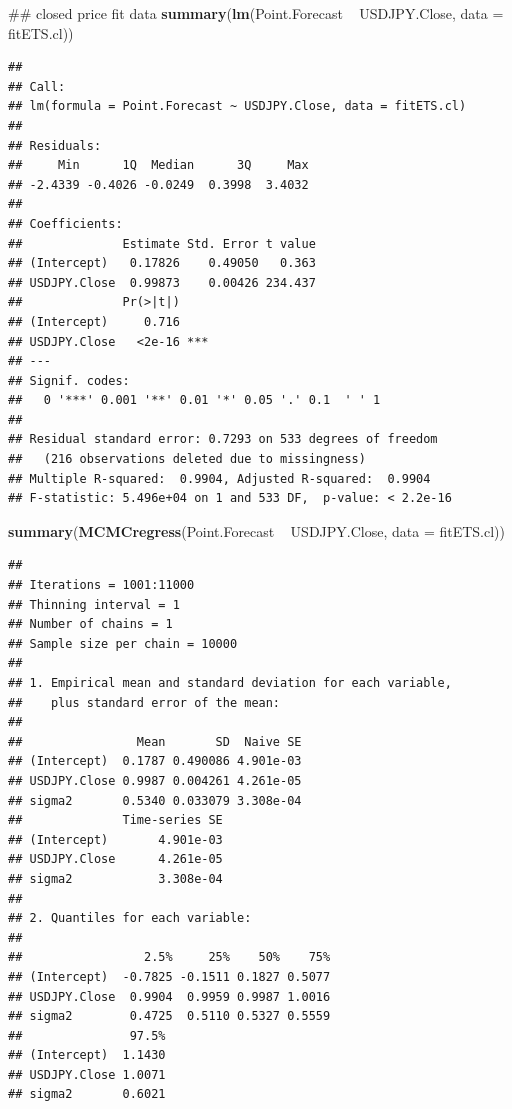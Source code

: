 \documentclass[]{tufte-book}
\newenvironment{Shaded}{}{}
\newcommand{\KeywordTok}[1]{\textcolor[rgb]{0.00,0.44,0.13}{\textbf{#1}}}
\newcommand{\DataTypeTok}[1]{\textcolor[rgb]{0.56,0.13,0.00}{#1}}
\newcommand{\StringTok}[1]{\textcolor[rgb]{0.25,0.44,0.63}{#1}}
\newcommand{\OperatorTok}[1]{\textcolor[rgb]{0.40,0.40,0.40}{#1}}
\newcommand{\NormalTok}[1]{#1}
\begin{document}
\begin{Shaded}
\begin{Highlighting}[]
\NormalTok{## closed price fit data}
\KeywordTok{summary}\NormalTok{(}\KeywordTok{lm}\NormalTok{(Point.Forecast }\OperatorTok{~}\StringTok{ }\NormalTok{USDJPY.Close, }\DataTypeTok{data =}\NormalTok{ fitETS.cl))}
\end{Highlighting}
\end{Shaded}

\begin{verbatim}
## 
## Call:
## lm(formula = Point.Forecast ~ USDJPY.Close, data = fitETS.cl)
## 
## Residuals:
##     Min      1Q  Median      3Q     Max 
## -2.4339 -0.4026 -0.0249  0.3998  3.4032 
## 
## Coefficients:
##              Estimate Std. Error t value
## (Intercept)   0.17826    0.49050   0.363
## USDJPY.Close  0.99873    0.00426 234.437
##              Pr(>|t|)    
## (Intercept)     0.716    
## USDJPY.Close   <2e-16 ***
## ---
## Signif. codes:  
##   0 '***' 0.001 '**' 0.01 '*' 0.05 '.' 0.1  ' ' 1
## 
## Residual standard error: 0.7293 on 533 degrees of freedom
##   (216 observations deleted due to missingness)
## Multiple R-squared:  0.9904, Adjusted R-squared:  0.9904 
## F-statistic: 5.496e+04 on 1 and 533 DF,  p-value: < 2.2e-16
\end{verbatim}

\begin{Shaded}
\begin{Highlighting}[]
\KeywordTok{summary}\NormalTok{(}\KeywordTok{MCMCregress}\NormalTok{(Point.Forecast }\OperatorTok{~}\StringTok{ }\NormalTok{USDJPY.Close, }
    \DataTypeTok{data =}\NormalTok{ fitETS.cl))}
\end{Highlighting}
\end{Shaded}

\begin{verbatim}
## 
## Iterations = 1001:11000
## Thinning interval = 1 
## Number of chains = 1 
## Sample size per chain = 10000 
## 
## 1. Empirical mean and standard deviation for each variable,
##    plus standard error of the mean:
## 
##                Mean       SD  Naive SE
## (Intercept)  0.1787 0.490086 4.901e-03
## USDJPY.Close 0.9987 0.004261 4.261e-05
## sigma2       0.5340 0.033079 3.308e-04
##              Time-series SE
## (Intercept)       4.901e-03
## USDJPY.Close      4.261e-05
## sigma2            3.308e-04
## 
## 2. Quantiles for each variable:
## 
##                 2.5%     25%    50%    75%
## (Intercept)  -0.7825 -0.1511 0.1827 0.5077
## USDJPY.Close  0.9904  0.9959 0.9987 1.0016
## sigma2        0.4725  0.5110 0.5327 0.5559
##               97.5%
## (Intercept)  1.1430
## USDJPY.Close 1.0071
## sigma2       0.6021
\end{verbatim}
\end{document}
